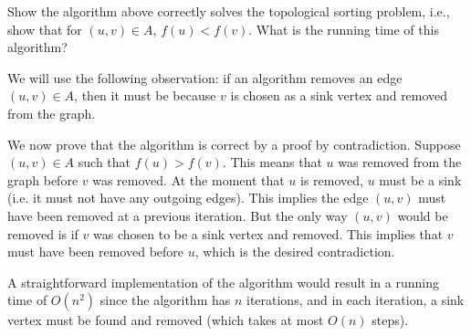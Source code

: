 \begin{flex}
\label{grp:xrcs:intro-to-graph-theory::topological-sort-correctness-of-na-i-ve-algorithm}

\begin{exercise}
\label{xrcs:intro-to-graph-theory::topological-sort-correctness-of-na-i-ve-algorithm}
Show the algorithm above correctly solves the topological sorting problem, i.e., show that for $(u,v) \in A$, $f(u) < f(v)$. What is the running time of this algorithm?

\end{exercise}

\begin{solution}
\label{sol:intro-to-graph-theory::observation}
We will use the following observation: if an algorithm removes an edge $(u,v) \in A$, then it must be because $v$ is chosen as a sink vertex and removed from the graph. 

We now prove that the algorithm is correct by a proof by contradiction. Suppose $(u,v) \in A$ such that $f(u) > f(v)$. This means that $u$ was removed from the graph before $v$ was removed. At the moment that $u$ is removed, $u$ must be a sink (i.e. it must not have any outgoing edges). This implies the edge $(u,v)$ must have been removed at a previous iteration. But the only way $(u,v)$ would be removed is if $v$ was chosen to be a sink vertex and removed. This implies that $v$ must have been removed before $u$, which is the desired contradiction.

A straightforward implementation of the algorithm would result in a running time of $O(n^2)$ since the algorithm has $n$ iterations, and in each iteration, a sink vertex must be found and removed (which takes at most $O(n)$ steps).

\end{solution}
\end{flex}


